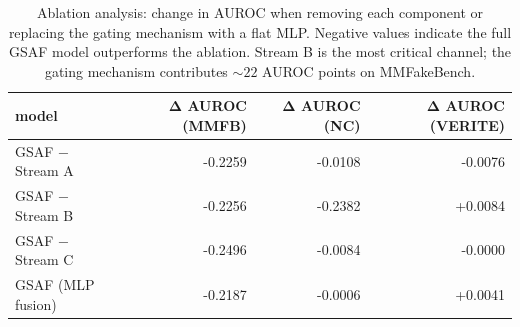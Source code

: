 \begin{table}[!t]
\centering
\caption{Ablation analysis: change in AUROC when removing each component or replacing the gating mechanism with a flat MLP. Negative values indicate the full GSAF model outperforms the ablation. Stream B is the most critical channel; the gating mechanism contributes ${\sim}22$ AUROC points on MMFakeBench.}
\label{tab:ablation_delta}
\begin{tabular}{lrrr}
\toprule
\textbf{model} & \textbf{Δ AUROC (MMFB)} & \textbf{Δ AUROC (NC)} & \textbf{Δ AUROC (VERITE)} \\
\midrule
GSAF − Stream A & -0.2259 & -0.0108 & -0.0076 \\
GSAF − Stream B & -0.2256 & -0.2382 & +0.0084 \\
GSAF − Stream C & -0.2496 & -0.0084 & -0.0000 \\
GSAF (MLP fusion) & -0.2187 & -0.0006 & +0.0041 \\
\bottomrule
\end{tabular}
\end{table}
